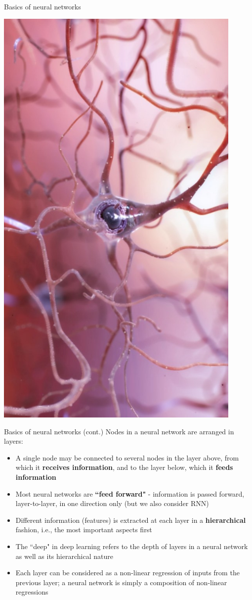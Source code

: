 \documentclass{beamer}
\begin{document}
\begin{frame}{Basics of neural networks}
\begin{minipage}{0.29\linewidth}
\includegraphics[width=0.9\textwidth]{Images/neuron.jpg}
\end{minipage}
\end{frame}
\begin{frame}{Basics of neural networks (cont.)}
 Nodes in a neural network are arranged in layers:
\begin{itemize}
\item A single node may be connected to several nodes in the layer above, from which it \textbf{receives information}, and to the layer below, which it \textbf{feeds information}
\item Most neural networks are \textbf{``feed forward"} - information is passed forward, layer-to-layer, in one direction only (but we also consider RNN)
\item Different information (features) is extracted at each layer in a \textbf{hierarchical} fashion, i.e., the most important aspects first
\item The ``deep" in deep learning refers to the depth of layers in a neural network as well as its hierarchical nature
\item Each layer can be considered as a non-linear regression of inputs from the previous layer; a neural network is simply a composition of non-linear regressions
\end{itemize}
\end{frame}
\end{document}

